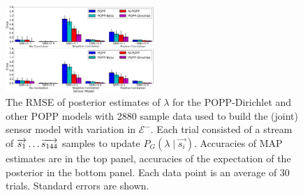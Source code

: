 \begin{figure}[t!]
	\centering
	\includegraphics[width=0.5\textwidth]{./figures/tjnr_comparison_2880.png}
    \caption{The RMSE of posterior estimates of $\lambda$ for the POPP-Dirichlet and other POPP models with 2880 sample data used to build the (joint) sensor model with variation in $\mathcal{E^-}$. Each trial consisted of a stream of $\protect\overrightarrow{s_1} \ldots \protect\overrightarrow{s_{144}}$ samples to update $P_G(\lambda \mid \overrightarrow{s_i})$. Accuracies of MAP estimates are in the top panel, accuracies of the expectation of the posterior in the bottom panel. Each data point is an average of 30 trials. Standard errors are shown.} 
	\label{fig:tjnr_comparison_2880}
\end{figure}
